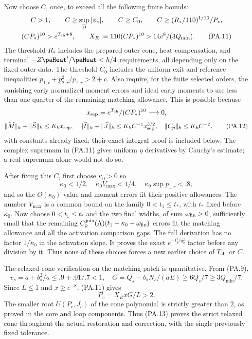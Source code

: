 \documentclass[10pt,a4paper]{article}
\newcounter{none}
\begin{document}
Now choose $C$, once, to exceed all the following finite bounds:
\[
\begin{gathered}
 C>1,\qquad C\ge\sup_{\overline\Omega}|\phi_*|,\qquad
 C\ge C_0,\qquad
 C\ge (R_*/110)^{1/10}/P_*,\\
 (CP_*)^{10}>e^{T_{\rm sh}+8},\qquad
 X_R:=110(CP_*)^{10}>14e^8/(3Q_{\min}).                          \tag{PA.11}
\end{gathered}
\]
The threshold $R_*$ includes the prepared outer cone, heat compensation, and
terminal $-Z\paHeat'/\paHeat<h/4$ requirements, all depending only on the fixed outer
data. The threshold $C_0$ includes the uniform exit and reference inequalities
$p_{1,r}+p_{2,r}^2/p_{1,r}>2+c$. Also require, for the finite selected orders,
the vanishing early normalized moment errors and ideal early moments to use less
than one quarter of the remaining matching allowance. This is possible because
\[
 x_{\rm sep}=e^{T_{\rm sh}}/(CP_*)^{10}\longrightarrow0,
\]
\[
 \|\widehat M\|_k+\|\widehat S\|_k\le K_kx_{\rm sep},\quad
 \|\widehat I\|_k+\|\widehat J\|_k\le K_kC^{-1}x_{\rm sep}^{3/2},
 \quad\|C_p\|_k\le K_kC^{-2},                                  \tag{PA.12}
\]
with constants already fixed; their exact integral proof is included below.
The complex supremum in (PA.11) gives uniform $\eta$ derivatives by Cauchy's
estimate; a real supremum alone would not do so.

After fixing this $C$, first choose $\kappa_0>0$ so
\[
 \kappa_0<1/2,\quad \kappa_0V_{\max}<1/4,\quad
 \kappa_0\sup p_{1,r}<.8,
\]
and so the $O(\kappa_0)$ value and moment errors fit their positive allowances.
The number $V_{\max}$ is a common bound on the family $0<t_1\le t_*$,
with $t_*$ fixed before $\kappa_0$. Now choose $0<t_1\le t_*$ and the two final
widths, of sum $\omega_{\rm fin}>0$, sufficiently small that the remaining
$C_k^{\rm join}(\Lambda)(t_1+\kappa_0+\omega_{\rm fin})$ errors fit the
matching allowance and all the activation comparison gaps. The full derivation
has no factor $1/\kappa_0$ in the activation slope. It proves the exact
$e^{-t_1^2/y_a^2}$ factor before any division by it. Thus none of these choices
forces a new earlier choice of $T_{\rm sh}$ or $C$.

The relaxed-cone verification on the matching patch is quantitative. From (PA.9),
\[
 v_s=a+b_s^2/a\le .9+.01/.7<1,\quad
 G=Q_s-b_sN_s/(aE)\ge6Q_s/7\ge3Q_{\min}/7.
\]
Since $L\le1$ and $x\ge e^{-8}$, (PA.11) gives
\[
 P_c=X_RxG/L>2.                                                 \tag{PA.13}
\]
The smaller root $U(P_c,J_c)$ of the cone polynomial is strictly greater than
$2$, as proved in the core and loop components. Thus (PA.13) proves the strict
relaxed cone throughout the actual restoration and correction, with the single
previously fixed tolerance.
\end{document}
